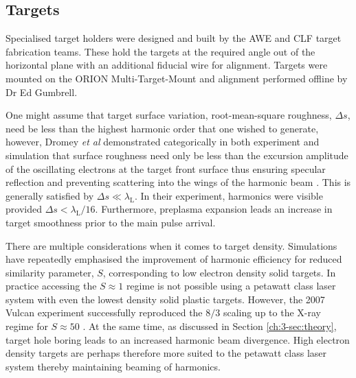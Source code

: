 


\subsection{Targets}
Specialised target holders were designed and built by the AWE and CLF target fabrication teams. These hold the targets at the required angle out of the horizontal plane with an additional fiducial wire for alignment. Targets were mounted on the ORION Multi-Target-Mount and alignment performed offline by Dr Ed Gumbrell.

One might assume that target surface variation, root-mean-square roughness, $\Delta s$, need be less than the highest harmonic order that one wished to generate, however, Dromey \textit{et al} demonstrated categorically in both experiment and simulation that surface roughness need only be less than the excursion amplitude of the oscillating electrons at the target front surface thus ensuring specular reflection and preventing scattering into the wings of the harmonic beam \cite{dromeyDiffractionlimitedPerformanceFocusing2009}. This is generally satisfied by $\Delta s \ll \lambda_\mathrm{L}$. In their experiment, harmonics were visible provided $\Delta s < \lambda_\mathrm{L}/16$. Furthermore, preplasma expansion leads an increase in target smoothness prior to the main pulse arrival.

There are multiple considerations when it comes to target density. Simulations have repeatedly emphasised the improvement of harmonic efficiency for reduced similarity parameter, $S$, \cite{gonoskovUltrarelativisticNanoplasmonicsRoute2011, edwardsXRayEmissionEffectiveness2020} corresponding to low electron density solid targets. In practice accessing the $S\approx 1$ regime is not possible using a petawatt class laser system with even the lowest density solid plastic targets. However, the 2007 Vulcan experiment successfully reproduced the $8/3$ scaling up to the X-ray regime for $S \approx 50 $ \cite{dromeyBrightMultikeVHarmonic2007}. At the same time, as discussed in Section \ref{ch:3-sec:theory}, target hole boring leads to an increased harmonic beam divergence. High electron density targets are perhaps therefore more suited to the petawatt class laser system thereby maintaining beaming of harmonics.

